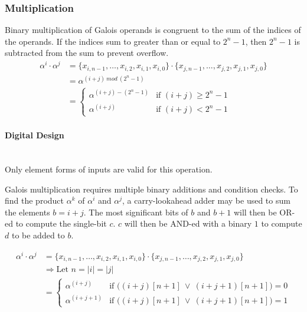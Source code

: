 \subsubsection{Multiplication} Binary multiplication of Galois operands is
congruent to the sum of the indices of the operands. If the indices sum to
greater than or equal to $2^{n}-1$, then $2^{n}-1$ is subtracted from the sum
to prevent overflow.
\begin{align*}
    \alpha^{i} \cdot \alpha^{j} & = \{ x_{i, n-1}, \ldots, x_{i, 2}, x_{i, 1},
    x_{i, 0} \} \cdot \{x_{j, n-1}, \ldots, x_{j, 2}, x_{j, 1}, x_{j, 0}\} \\
    & = \alpha^{(i + j) \ mod \ (2^{n}-1)} \\
    & = \begin{cases}
            \alpha^{(i + j) - (2^{n}-1)} & \text{if $(i + j) \geq 2^{n}-1$} \\
            \alpha^{(i + j)} & \text{if $(i + j) < 2^{n}-1$}
        \end{cases}
\end{align*}

    \paragraph{{\small Digital Design}} \leavevmode \\ Only element forms of
    inputs are valid for this operation.

    Galois multiplication requires multiple binary additions and condition
    checks. To find the product $\alpha^{k}$ of $\alpha^{i}$ and $\alpha^{j}$,
    a carry-lookahead adder may be used to sum the elements $b=i+j$. The most
    significant bits of $b$ and $b + 1$ will then be OR-ed to compute the
    single-bit $c$. $c$ will then be AND-ed with a binary $1$ to compute $d$ to
    be added to $b$.

\begin{align*}
    \alpha^{i} \cdot \alpha^{j} & = \{ x_{i, n-1}, \ldots, x_{i, 2}, x_{i, 1},
    x_{i, 0} \} \cdot \{x_{j, n-1}, \ldots, x_{j, 2}, x_{j, 1}, x_{j, 0}\} \\
    & \Longrightarrow \text{Let } n = |i| = |j| \\
    & = \begin{cases}
            \alpha^{(i + j)} & \text{if $\Big((i+j)[n+1] \ \vee \
            (i+j+1)[n+1]\Big)=0$} \\
            \alpha^{(i + j + 1)} & \text{if $\Big((i+j)[n+1] \ \vee \
            (i+j+1)[n+1]\Big)=1$}
        \end{cases}
\end{align*}
